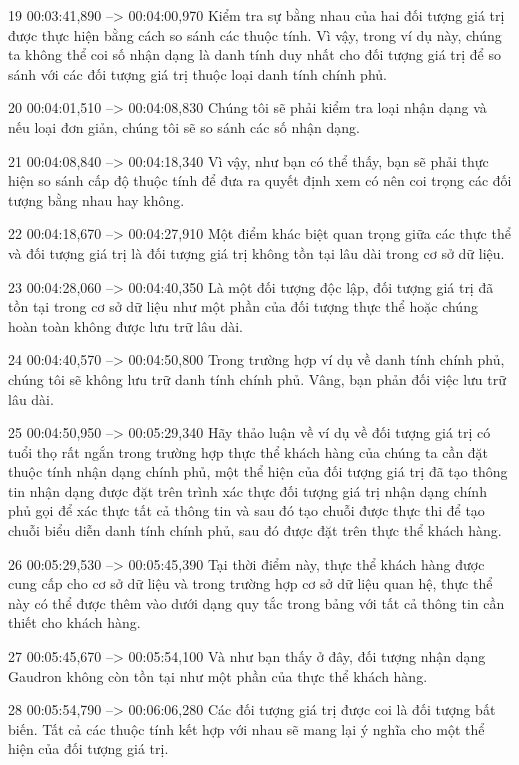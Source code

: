 19
00:03:41,890 --> 00:04:00,970
Kiểm tra sự bằng nhau của hai đối tượng giá trị được thực hiện bằng cách so sánh các thuộc tính.  Vì vậy, trong ví dụ này, chúng ta không thể coi số nhận dạng là danh tính duy nhất cho đối tượng giá trị để so sánh với các đối tượng giá trị thuộc loại danh tính chính phủ.

20
00:04:01,510 --> 00:04:08,830
Chúng tôi sẽ phải kiểm tra loại nhận dạng và nếu loại đơn giản, chúng tôi sẽ so sánh các số nhận dạng.

21
00:04:08,840 --> 00:04:18,340
Vì vậy, như bạn có thể thấy, bạn sẽ phải thực hiện so sánh cấp độ thuộc tính để đưa ra quyết định xem có nên coi trọng các đối tượng bằng nhau hay không.

22
00:04:18,670 --> 00:04:27,910
Một điểm khác biệt quan trọng giữa các thực thể và đối tượng giá trị là đối tượng giá trị không tồn tại lâu dài trong cơ sở dữ liệu.

23
00:04:28,060 --> 00:04:40,350
Là một đối tượng độc lập, đối tượng giá trị đã tồn tại trong cơ sở dữ liệu như một phần của đối tượng thực thể hoặc chúng hoàn toàn không được lưu trữ lâu dài.

24
00:04:40,570 --> 00:04:50,800
Trong trường hợp ví dụ về danh tính chính phủ, chúng tôi sẽ không lưu trữ danh tính chính phủ.  Vâng, bạn phản đối việc lưu trữ lâu dài.

25
00:04:50,950 --> 00:05:29,340
Hãy thảo luận về ví dụ về đối tượng giá trị có tuổi thọ rất ngắn trong trường hợp thực thể khách hàng của chúng ta cần đặt thuộc tính nhận dạng chính phủ, một thể hiện của đối tượng giá trị đã tạo thông tin nhận dạng được đặt trên trình xác thực đối tượng giá trị nhận dạng chính phủ  gọi để xác thực tất cả thông tin và sau đó tạo chuỗi được thực thi để tạo chuỗi biểu diễn danh tính chính phủ, sau đó được đặt trên thực thể khách hàng.

26
00:05:29,530 --> 00:05:45,390
Tại thời điểm này, thực thể khách hàng được cung cấp cho cơ sở dữ liệu và trong trường hợp cơ sở dữ liệu quan hệ, thực thể này có thể được thêm vào dưới dạng quy tắc trong bảng với tất cả thông tin cần thiết cho khách hàng.

27
00:05:45,670 --> 00:05:54,100
Và như bạn thấy ở đây, đối tượng nhận dạng Gaudron không còn tồn tại như một phần của thực thể khách hàng.

28
00:05:54,790 --> 00:06:06,280
Các đối tượng giá trị được coi là đối tượng bất biến.  Tất cả các thuộc tính kết hợp với nhau sẽ mang lại ý nghĩa cho một thể hiện của đối tượng giá trị.

